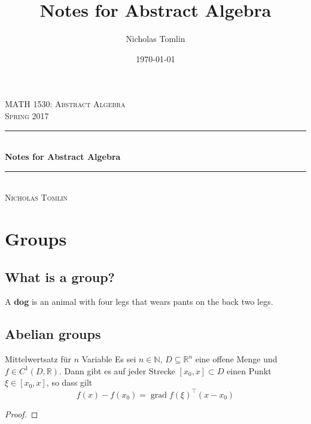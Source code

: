 \documentclass{article}
\title{Notes for Abstract Algebra}
\author{Nicholas Tomlin}
\date{\today}
\theoremstyle{plain}
\newcommand{\HRuleRed}{\textcolor{Maroon}{\rule{\linewidth}{0.5mm}}}
\begin{document}
\thispagestyle{empty}
\begin{center}
\textsc{\Large MATH 1530: Abstract Algebra}\\[0.4cm]
\textsc{\large Spring 2017}\\[0.2cm]

\HRuleRed\\[0.4cm]
{ \huge \bfseries Notes for Abstract Algebra}\\[0.1cm]
\HRuleRed\\[0.2cm]

\Large \textsc{Nicholas Tomlin}
\end{center}
\tableofcontents

\section{Groups}

\subsection{What is a group?}

\blindtext

\begin{definition}{}{}
A \textbf{dog} is an animal with four legs that wears pants on the back two legs.
\end{definition}

\blindtext

\subsection{Abelian groups}

\blindtext

\begin{theorem}{Mittelwertsatz f\"{u}r $n$ Variable}{}
Es sei $n\in\mathbb{N}$, $D\subseteq\mathbb{R}^n$ eine offene Menge und
$f\in C^{1}(D,\mathbb{R})$. Dann gibt es auf jeder Strecke
$[x_0,x]\subset D$ einen Punkt $\xi\in[x_0,x]$, so dass gilt
\begin{equation*}
f(x)-f(x_0) = \operatorname{grad} f(\xi)^{\top}(x-x_0)
\end{equation*}
\end{theorem}

\begin{proof}
\blindtext
\end{proof}
\end{document}

